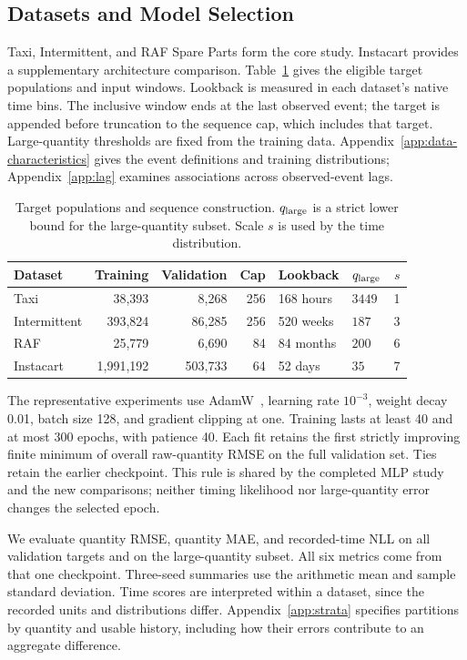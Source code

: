 \documentclass[runningheads]{llncs}
\begin{document}
\subsection{Datasets and Model Selection}
Taxi, Intermittent, and RAF Spare Parts form the core study. Instacart provides a supplementary architecture comparison. Table~\ref{tab:data} gives the eligible target populations and input windows. Lookback is measured in each dataset's native time bins. The inclusive window ends at the last observed event; the target is appended before truncation to the sequence cap, which includes that target. Large-quantity thresholds are fixed from the training data. Appendix~\ref{app:data-characteristics} gives the event definitions and training distributions; Appendix~\ref{app:lag} examines associations across observed-event lags.

\begin{table}[t]
\caption{Target populations and sequence construction. $q_{\rm large}$ is a strict lower bound for the large-quantity subset. Scale $s$ is used by the time distribution.}
\label{tab:data}
\centering\small
\setlength{\tabcolsep}{4pt}
\begin{tabular}{@{}lrrrllr@{}}
\toprule
Dataset & Training & Validation & Cap & Lookback & $q_{\rm large}$ & $s$\\
\midrule
Taxi & 38,393 & 8,268 & 256 & 168 hours & $3449$ & 1\\
Intermittent & 393,824 & 86,285 & 256 & 520 weeks & $187$ & 3\\
RAF & 25,779 & 6,690 & 84 & 84 months & $200$ & 6\\
Instacart & 1,991,192 & 503,733 & 64 & 52 days & $35$ & 7\\
\bottomrule
\end{tabular}
\end{table}

The representative experiments use AdamW~\cite{loshchilov2019adamw}, learning rate $10^{-3}$, weight decay 0.01, batch size 128, and gradient clipping at one. Training lasts at least 40 and at most 300 epochs, with patience 40. Each fit retains the first strictly improving finite minimum of overall raw-quantity RMSE on the full validation set. Ties retain the earlier checkpoint. This rule is shared by the completed MLP study and the new comparisons; neither timing likelihood nor large-quantity error changes the selected epoch.

We evaluate quantity RMSE, quantity MAE, and recorded-time NLL on all validation targets and on the large-quantity subset. All six metrics come from that one checkpoint. Three-seed summaries use the arithmetic mean and sample standard deviation. Time scores are interpreted within a dataset, since the recorded units and distributions differ. Appendix~\ref{app:strata} specifies partitions by quantity and usable history, including how their errors contribute to an aggregate difference.
\end{document}
